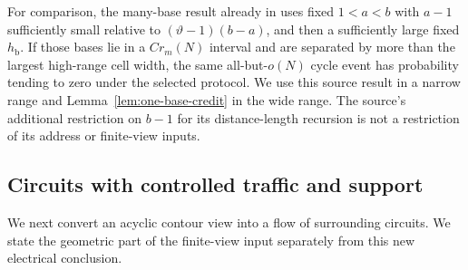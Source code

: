 For comparison, the many-base result already in
\cite[Proposition~10.18]{P} uses fixed \(1<a<b\) with \(a-1\)
sufficiently small relative to
\((\vartheta-1)(b-a)\), and then a sufficiently large fixed
\(h_{\mathrm b}\).  If those bases lie in a \(C r_m(N)\)
interval and are separated by more than the largest high-range
cell width, the same all-but-\(o(N)\) cycle event has probability
tending to zero under the selected protocol.  We use this source
result in a narrow range and Lemma~\ref{lem:one-base-credit} in
the wide range.  The source's additional restriction on \(b-1\)
for its distance-length recursion is not a restriction of its
address or finite-view inputs.

\subsection{Circuits with controlled traffic and support}

We next convert an acyclic contour view into a flow of surrounding
circuits.  We state the geometric part of the finite-view input
separately from this new electrical conclusion.

